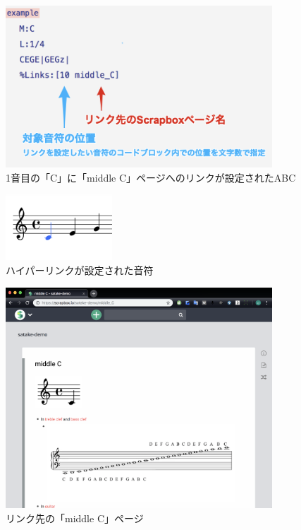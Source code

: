 \begin{figure}[H]
\centering
\includegraphics[width=10cm]{images/linkabc.png}
\caption{1音目の「C」に「middle C」ページへのリンクが設定されたABC}
\label{linkabc}
\end{figure}

\begin{figure}[H]
\centering
\includegraphics[width=4cm]{images/linkednote.png}
\caption{ハイパーリンクが設定された音符}
\label{linkednote}
\end{figure}

\begin{figure}[H]
\centering
\includegraphics[width=10cm]{images/middlec.png}
\caption{リンク先の「middle C」ページ}
\label{middlec}
\end{figure}

